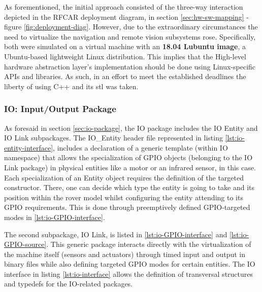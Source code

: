 As forementioned, the initial approach consisted of the three-way interaction depicted in the RFCAR deployment diagram, in section \ref{sec:hw-sw-mapping} - figure \ref{fig:deployment-diag}. However, due to the extraordinary circumstances the need to virtualize the navigation and remote vision subsystems rose. Specifically, both were simulated on a virtual machine with an \textbf{18.04 Lubuntu image}, a Ubuntu-based lightweight Linux distribution. This implies that the High-level hardware abstraction layer's implementation should be done using Linux-specific APIs and libraries. As such, in an effort to meet the established deadlines the liberty of using C++ and its \gls{stl} was taken. 
%
\subsubsection{IO: Input/Output Package}
As foresaid in section \ref{sec:io-package}, the IO package includes the IO Entity and IO Link subpackages. The IO_Entity header file represented in listing \ref{lst:io-entity-interface}, includes a declaration of a generic template (within IO namespace) that allows the specialization of GPIO objects (belonging to the IO Link package) in physical entities like a motor or an infrared sensor, in this case. Each specialization of an Entity object requires the definition of the targeted constructor. There, one can decide which type the entity is going to take and its position within the rover model whilst configuring the entity attending to its GPIO requirements. This is done through preemptively defined GPIO-targeted modes in \ref{lst:io-GPIO-interface}.\par
%
The second subpackage, IO Link, is listed in \ref{lst:io-GPIO-interface} and \ref{lst:io-GPIO-source}. This generic package interacts directly with the virtualization of the machine itself (sensors and actuators) through timed input and output in binary files while also defining targeted GPIO modes for certain entities. The IO interface in listing \ref{lst:io-interface} allows the definition of transversal structures and typedefs for the IO-related packages.
%

%

%

%

%
%
